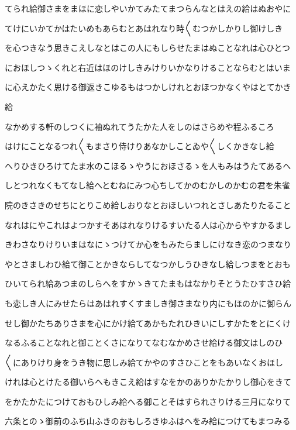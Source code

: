 \documentclass[a4paper,11pt,landscape]{ltjtarticle}
\begin{document}
\par\medskip
てられ給御さまをまほに恋しやいかてみたてまつらんなとはえの給はぬおやに
\par\medskip
てけにいかてかはたいめもあらむとあはれなり時〱むつかしかりし御けしき
\par\medskip
を心つきなう思きこえしなとはこの人にもしらせたまはぬことなれは心ひとつ
\par\medskip
におほしつゝくれと右近はほのけしきみけりいかなりけることならむとはいま
\par\medskip
に心えかたく思ける御返きこゆるもはつかしけれとおほつかなくやはとてかき
\par\medskip
給
\par\medskip
なかめする軒のしつくに袖ぬれてうたかた人をしのはさらめや程ふるころ
\par\medskip
はけにことなるつれ〱もまさり侍けりあなかしことゐや〱しくかきなし給
\par\medskip
へりひきひろけてたま水のこほるゝやうにおほさるゝを人もみはうたてあるへ
\par\medskip
しとつれなくもてなし給へとむねにみつ心ちしてかのむかしのかむの君を朱雀
\par\medskip
院のきさきのせちにとりこめ給しおりなとおほしいつれとさしあたりたること
\par\medskip
なれはにやこれはよつかすそあはれなりけるすいたる人は心からやすかるまし
\par\medskip
きわさなりけりいまはなにゝつけてか心をもみたらましにけなき恋のつまなり
\par\medskip
やとさましわひ給て御ことかきならしてなつかしうひきなし給しつまをとおも
\par\medskip
ひいてられ給あつまのしらへをすかゝきてたまもはなかりそとうたひすさひ給
\par\medskip
も恋しき人にみせたらはあはれすくすましき御さまなり内にもほのかに御らん
\par\medskip
せし御かたちありさまを心にかけ給てあかもたれひきいにしすかたをとにくけ
\par\medskip
なるふることなれと御ことくさになりてなむなかめさせ給ける御文はしのひ
\par\medskip
〱にありけり身をうき物に思しみ給てかやのすさひことをもあいなくおほし
\par\medskip
けれは心とけたる御いらへもきこえ給はすなをかのありかたかりし御心をきて
\par\medskip
をかたかたにつけておもひしみ給へる御ことそはすられさりける三月になりて
\par\medskip
六条とのゝ御前のふち山ふきのおもしろきゆふはへをみ給につけてもまつみる
\end{document}
